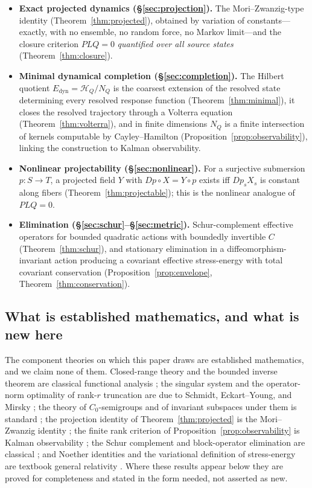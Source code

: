 \documentclass[11pt,reqno]{amsart}
\numberwithin{equation}{section}
\theoremstyle{plain}
\theoremstyle{definition}
\theoremstyle{remark}
\newcommand{\HQ}{\mathcal{H}_{Q}}
\newcommand{\Edyn}{E_{\mathrm{dyn}}}
\begin{document}
\begin{itemize}
\item \textbf{Exact projected dynamics (\S\ref{sec:projection}).} The Mori--Zwanzig-type
identity (Theorem~\ref{thm:projected}), obtained by variation of constants---exactly, with
no ensemble, no random force, no Markov limit---and the closure criterion $PLQ=0$
\emph{quantified over all source states} (Theorem~\ref{thm:closure}).

\item \textbf{Minimal dynamical completion (\S\ref{sec:completion}).} The Hilbert quotient
$\Edyn=\HQ/N_Q$ is the coarsest extension of the resolved state determining every resolved
response function (Theorem~\ref{thm:minimal}), it closes the resolved trajectory through a
Volterra equation (Theorem~\ref{thm:volterra}), and in finite dimensions $N_Q$ is a finite
intersection of kernels computable by Cayley--Hamilton
(Proposition~\ref{prop:observability}), linking the construction to Kalman observability.

\item \textbf{Nonlinear projectability (\S\ref{sec:nonlinear}).} For a surjective submersion
$p:S\to T$, a projected field $Y$ with $Dp\circ X=Y\circ p$ exists iff $Dp_sX_s$ is constant
along fibers (Theorem~\ref{thm:projectable}); this is the nonlinear analogue of $PLQ=0$.

\item \textbf{Elimination (\S\ref{sec:schur}--\S\ref{sec:metric}).} Schur-complement
effective operators for bounded quadratic actions with boundedly invertible $C$
(Theorem~\ref{thm:schur}), and stationary elimination in a diffeomorphism-invariant action
producing a covariant effective stress-energy with total covariant conservation
(Proposition~\ref{prop:envelope}, Theorem~\ref{thm:conservation}).
\end{itemize}

\subsection{What is established mathematics, and what is new here}
\label{subsec:originality}

The component theories on which this paper draws are established mathematics, and we claim
none of them. Closed-range theory and the bounded inverse theorem are classical functional
analysis \cite{Brezis,ReedSimon1}; the singular system and the operator-norm optimality of
rank-$r$ truncation are due to Schmidt, Eckart--Young, and Mirsky
\cite{Schmidt,EckartYoung,Mirsky}; the theory of $C_{0}$-semigroups and of invariant subspaces
under them is standard \cite{EngelNagel,Pazy}; the projection identity of
Theorem~\ref{thm:projected} is the Mori--Zwanzig identity \cite{Zwanzig1960,Mori1965,Zwanzig2001};
the finite rank criterion of Proposition~\ref{prop:observability} is Kalman observability
\cite{Kalman1960,Sontag}; the Schur complement and block-operator elimination are classical
\cite{Zhang}; and Noether identities and the variational definition of stress-energy are
textbook general relativity \cite{Wald}. Where these results appear below they are proved for
completeness and stated in the form needed, not asserted as new.
\end{document}

